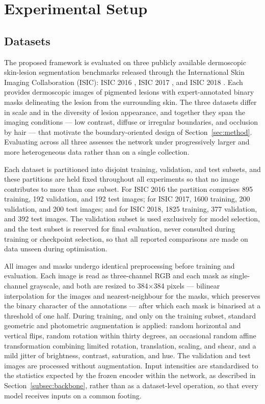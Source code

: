 \section{Experimental Setup}
\label{sec:exp}

\subsection{Datasets}

The proposed framework is evaluated on three publicly available dermoscopic skin-lesion segmentation benchmarks released through the International Skin Imaging Collaboration (ISIC): ISIC 2016 \cite{ref20}, ISIC 2017 \cite{ref21}, and ISIC 2018 \cite{ref22}. Each provides dermoscopic images of pigmented lesions with expert-annotated binary masks delineating the lesion from the surrounding skin. The three datasets differ in scale and in the diversity of lesion appearance, and together they span the imaging conditions --- low contrast, diffuse or irregular boundaries, and occlusion by hair --- that motivate the boundary-oriented design of Section~\ref{sec:method}. Evaluating across all three assesses the network under progressively larger and more heterogeneous data rather than on a single collection.

Each dataset is partitioned into disjoint training, validation, and test subsets, and these partitions are held fixed throughout all experiments so that no image contributes to more than one subset. For ISIC 2016 the partition comprises 895 training, 192 validation, and 192 test images; for ISIC 2017, 1600 training, 200 validation, and 200 test images; and for ISIC 2018, 1825 training, 377 validation, and 392 test images. The validation subset is used exclusively for model selection, and the test subset is reserved for final evaluation, never consulted during training or checkpoint selection, so that all reported comparisons are made on data unseen during optimisation.

All images and masks undergo identical preprocessing before training and evaluation. Each image is read as three-channel RGB and each mask as single-channel grayscale, and both are resized to 384$\times$384 pixels --- bilinear interpolation for the images and nearest-neighbour for the masks, which preserves the binary character of the annotations --- after which each mask is binarised at a threshold of one half. During training, and only on the training subset, standard geometric and photometric augmentation is applied: random horizontal and vertical flips, random rotation within thirty degrees, an occasional random affine transformation combining limited rotation, translation, scaling, and shear, and a mild jitter of brightness, contrast, saturation, and hue. The validation and test images are processed without augmentation. Input intensities are standardised to the statistics expected by the frozen encoder within the network, as described in Section~\ref{subsec:backbone}, rather than as a dataset-level operation, so that every model receives inputs on a common footing.

